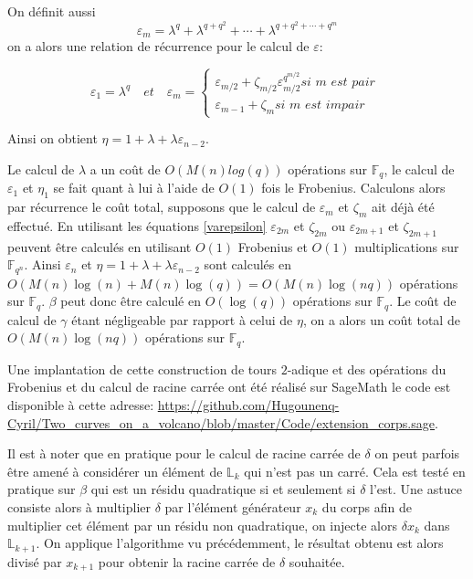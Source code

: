 \documentclass[10pt,a4paper]{book}
\theoremstyle{plain}
\theoremstyle{definition}
\theoremstyle{definition}
\theoremstyle{definition}
\theoremstyle{definition}
\theoremstyle{remark}
\theoremstyle{remark}
\begin{document}
On définit aussi
\begin{equation*}
\varepsilon_m=\lambda^{q} + \lambda^{q+q^2} + \cdots + \lambda^{q+q^2+\cdots+q^{m}}
\end{equation*} 
on a alors une relation de récurrence pour le calcul de $\varepsilon$:

\begin{equation}
\label{eq:varepsilon}
\varepsilon_1=\lambda^q \quad \textit{et} \quad
\varepsilon_m=
\begin{cases} 
\varepsilon_{m/2} + \zeta_{m/2}\varepsilon_{m/2}^{q^{m/2}} \textit{si m est pair }\\
\varepsilon_{m-1} + \zeta_{m} \textit{si m est impair}
\end{cases}
\end{equation}

Ainsi on obtient $\eta=1+\lambda+\lambda \varepsilon_{n-2}$. 


 
Le calcul de $\lambda$ a un coût de $O(M(n)log(q))$ opérations sur $\mathbb{F}_q$, le calcul de $\varepsilon_1$ et $\eta_1$ se fait quant à lui à l'aide de $O(1)$ fois le Frobenius. Calculons alors par récurrence le coût total, supposons que le calcul de $\varepsilon_m$ et $\zeta_m$ ait déjà été effectué. En utilisant les équations \ref{varepsilon} $\varepsilon_{2m}$ et $\zeta_{2m}$ ou $\varepsilon_{2m+1}$ et $\zeta_{2m+1}$ peuvent être calculés en utilisant $O(1)$ Frobenius et $O(1)$ multiplications sur $\mathbb{F}_{q^n}$. Ainsi $\varepsilon_n$ et $\eta=1+\lambda+\lambda\varepsilon_{n-2}$ sont calculés en $O(M(n)\log(n)+M(n)\log(q))=O(M(n)\log(nq))$ opérations sur $\mathbb{F}_q$.
$\beta$ peut donc être calculé en $O(\log(q))$ opérations sur $\mathbb{F}_q$. Le coût de calcul de $\gamma$ étant négligeable par rapport à celui de $\eta$, on a alors un coût total de $O(M(n)\log(nq))$ opérations sur $\mathbb{F}_q$.

Une implantation de cette construction de tours $2$-adique et des opérations du Frobenius et du calcul de racine carrée ont été réalisé sur SageMath le code est disponible à cette adresse: \url{https://github.com/Hugounenq-Cyril/Two_curves_on_a_volcano/blob/master/Code/extension_corps.sage}.

Il est à noter que en pratique pour le calcul de racine carrée de $\delta$ on peut parfois être amené à considérer un élément de $\mathbb{L}_k$ qui n'est pas un carré. Cela est testé en pratique sur $\beta$ qui est un résidu quadratique si et seulement si $\delta$ l'est. Une astuce consiste alors à multiplier $\delta$ par l'élément générateur $x_{k}$ du corps afin  de multiplier cet élément par un résidu non quadratique, on injecte alors $\delta x_k$ dans $\mathbb{L}_{k+1}$. On applique l'algorithme vu précédemment, le résultat obtenu est alors divisé par $x_{k+1}$ pour obtenir la racine carrée de $\delta$ souhaitée.
\end{document}
